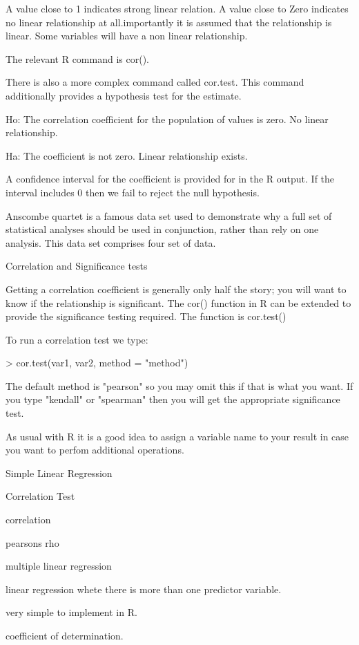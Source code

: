 A value close to 1 indicates strong linear relation. A value close to Zero indicates no linear relationship at all.importantly it is assumed that the relationship is linear. Some variables will have a non linear relationship.

The relevant R command is cor().

There is also a more complex command called cor.test. This command additionally provides a hypothesis test for the estimate.

Ho: The correlation coefficient for the population of values is zero. No linear relationship.

Ha: The coefficient is not zero. Linear relationship exists.

A confidence interval for the coefficient is provided for in the R output. If the interval includes 0 then we fail to reject the null hypothesis.

Anscombe quartet is a famous data set used to demonstrate why a full set of statistical analyses should be used in conjunction, rather than rely on one analysis. This data set comprises four set of data.


Correlation and Significance tests

Getting a correlation coefficient is generally only half the story; you will want to know if the relationship is significant. The cor() function in R can be extended to provide the significance testing required. The function is cor.test()


To run a correlation test we type:

> cor.test(var1, var2, method = "method")

The default method is "pearson" so you may omit this if that is what you want. If you type "kendall" or "spearman" then you will get the appropriate significance test.

As usual with R it is a good idea to assign a variable name to your result in case you want to perfom additional operations.

Simple Linear Regression

Correlation Test

correlation

pearsons rho



 multiple linear regression


linear regression whete there is more than one predictor variable.

very simple to implement in R.


coefficient of determination. 

